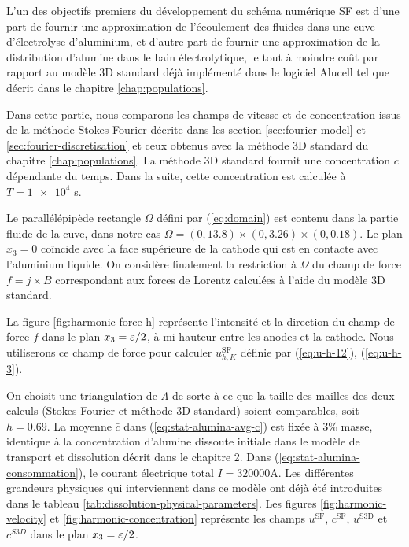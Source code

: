 \renewcommand{\floatpagefraction}{.9}%
\renewcommand{\topfraction}{0.9}

L'un des objectifs premiers du développement du schéma numérique
SF est d'une part de fournir une approximation de l'écoulement des
fluides dans une cuve d'électrolyse d'aluminium, et d'autre part
de fournir une approximation de la distribution d'alumine dans le bain
électrolytique, le tout à moindre coût par rapport au modèle
3D standard déjà implémenté dans le logiciel Alucell tel que décrit
dans le chapitre \ref{chap:populations}.

Dans cette partie, nous comparons les champs de vitesse et de
concentration issus de la méthode Stokes Fourier décrite dans les
section \ref{sec:fourier-model} et \ref{sec:fourier-discretisation} et
ceux obtenus avec la méthode 3D standard du chapitre
\ref{chap:populations}. La méthode 3D standard fournit une
concentration $c$ dépendante du temps. Dans la suite, cette
concentration est calculée à $T = \num{1e4}$ \si{\second}.

Le parallélépipède rectangle $\Omega$ défini par (\ref{eq:domain}) est
contenu dans la partie fluide de la cuve, dans notre cas $\Omega = (0,
\num{13.8})\times(0,\num{3.26})\times(0,\num{0.18})$. Le plan $x_3 =
0$ coïncide avec la face supérieure de la cathode qui est en contacte
avec l'aluminium liquide. On considère finalement la restriction à
$\Omega$ du champ de force $f = j\times B$ correspondant aux forces de
Lorentz calculées à l'aide du modèle 3D standard.

La figure \ref{fig:harmonic-force-h} représente l'intensité et la
direction du champ de force $f$ dans le plan $x_3 = \varepsilon / 2$,
à mi-hauteur entre les anodes et la cathode. Nous utiliserons ce champ
de force pour calculer $u_{h,K}^\mathrm{SF}$ définie par
(\ref{eq:u-h-12}), (\ref{eq:u-h-3}).

On choisit une triangulation de $\Lambda$ de sorte à ce que la taille
des mailles des deux calculs (Stokes-Fourier et méthode 3D standard)
soient comparables, soit $h = \num{0.69}$. La moyenne $\bar{c}$ dans
(\ref{eq:stat-alumina-avg-c}) est fixée à 3\% masse, identique à la
concentration d'alumine dissoute initiale dans le modèle de transport
et dissolution décrit dans le chapitre 2. Dans
(\ref{eq:stat-alumina-consommation}), le courant électrique total $I =
\num{320000} \si{\ampere}$. Les différentes grandeurs physiques qui
interviennent dans ce modèle ont déjà été introduites dans le tableau
\ref{tab:dissolution-physical-parameters}. Les figures
\ref{fig:harmonic-velocity} et \ref{fig:harmonic-concentration}
représente les champs $u^{\mathrm{SF}}$, $c^\mathrm{SF}$,
$u^\mathrm{S3D}$ et $c^{S3D}$ dans le plan $x_3 = \varepsilon / 2$.

